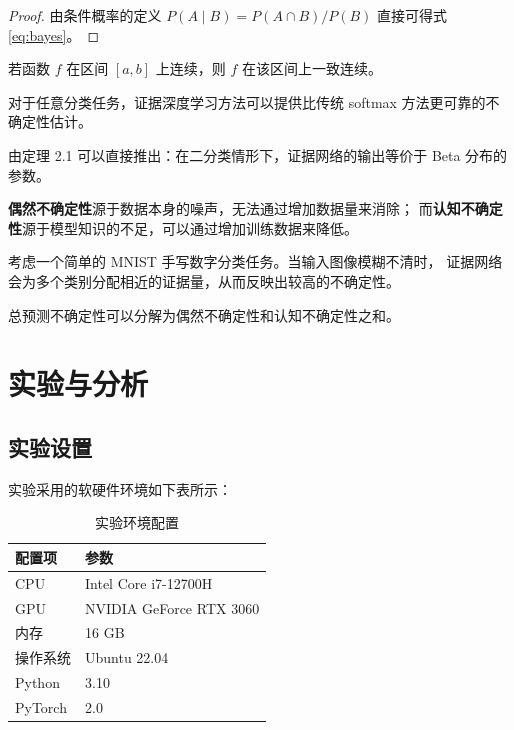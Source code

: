 \documentclass{nefuthesis}
\begin{document}
\begin{thesis}
\begin{proof}
由条件概率的定义 $P(A \mid B) = P(A \cap B) / P(B)$ 直接可得式 \eqref{eq:bayes}。
\end{proof}

\begin{lemma}
若函数 $f$ 在区间 $[a,b]$ 上连续，则 $f$ 在该区间上一致连续。
\end{lemma}

\begin{proposition}
对于任意分类任务，证据深度学习方法可以提供比传统 softmax 方法更可靠的不确定性估计。
\end{proposition}

\begin{deduction}
由定理 2.1 可以直接推出：在二分类情形下，证据网络的输出等价于 Beta 分布的参数。
\end{deduction}

\begin{remark}
\textbf{偶然不确定性}源于数据本身的噪声，无法通过增加数据量来消除；
而\textbf{认知不确定性}源于模型知识的不足，可以通过增加训练数据来降低。
\end{remark}

\begin{example}
考虑一个简单的 MNIST 手写数字分类任务。当输入图像模糊不清时，
证据网络会为多个类别分配相近的证据量，从而反映出较高的不确定性。
\end{example}

\begin{property}[不确定性可分解性]
总预测不确定性可以分解为偶然不确定性和认知不确定性之和。
\end{property}

\section{实验与分析}

\subsection{实验设置}

实验采用的软硬件环境如下表所示：

\begin{table}[H]
    \centering
    \caption{实验环境配置}
    \label{tab:env}
    \begin{tabular}{ll}
        \toprule
        配置项 & 参数 \\
        \midrule
        CPU      & Intel Core i7-12700H \\
        GPU      & NVIDIA GeForce RTX 3060 \\
        内存     & 16 GB \\
        操作系统 & Ubuntu 22.04 \\
        Python   & 3.10 \\
        PyTorch  & 2.0 \\
        \bottomrule
    \end{tabular}
\end{table}


\end{thesis}
\end{document}

